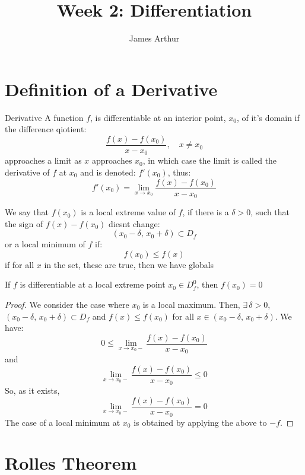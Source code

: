 \documentclass{article}
\title{Week 2: Differentiation}
\author{James Arthur}
\newcommand{\sub}{\subset}
\renewcommand{\d}{\delta}
\newcommand{\ex}{\exists\,}
\begin{document}
\maketitle
\tableofcontents
\newpage


\section{Definition of a Derivative}
\noindent\begin{definition}{Derivative}{}
   A function $f$, is differentiable at an interior point, $x_0$, of it's domain if the difference qiotient:
   $$ \frac{f(x) - f(x_0)}{x -x_0}, \quad x\neq x_0 $$
   approaches a limit as $x$ approaches $x_0$, in which case the limit is called the {\color{blue} derivative }of $f$ at $x_0$ and is denoted: $f'(x_0)$, thus:
   $$ f'(x_0) = \lim_{x\to x_0}\frac{f(x) - f(x_0)}{x -x_0} $$
\end{definition}\vspace{10pt}

\noindent\begin{definition}{}{}
   We say that $f(x_0)$ is a {\color{blue} local extreme }value of $f$, if there is a $\d > 0$, such that the sign of $f(x) - f(x_0)$ diesnt change:
   $$ (x_0 - \d, \, x_0 + \d) \sub D_f $$
   or a {\color{blue} local minimum } of $f$ if:
   $$ f(x_0) \le f(x) $$
   if for all $x$ in the set, these are true, then we have globals
\end{definition}\vspace{10pt}

\noindent\begin{theorem}{}{}
  If $f$ is differentiable at a local extreme point $x_0 \in D_f^0$, then $f(x_0) = 0$
\end{theorem}\vspace{10pt}
\begin{proof}
  We consider the case where $x_0$ is a local maximum. Then, $\ex \d > 0$, $\displaystyle{(x_0 - \d,\, x_0 + \d) \sub D_f}$ and $f(x) \le f(x_0)$ for all $x\in (x_0-\d,\, x_0+\d)$. We have:
  $$ 0 \le \lim_{x\to x_0-} \frac{f(x) - f(x_0)}{x - x_0} $$
  and
  $$ \lim_{x\to x_0-} \frac{f(x) - f(x_0)}{x - x_0} \le 0$$
  So, as it exists,
  $$ \lim_{x\to x_0-} \frac{f(x) - f(x_0)}{x - x_0} = 0 $$
  The case of a local minimum at $x_0$ is obtained by applying the above to $-f$.
\end{proof}

\section{Rolles Theorem}
\end{document}
